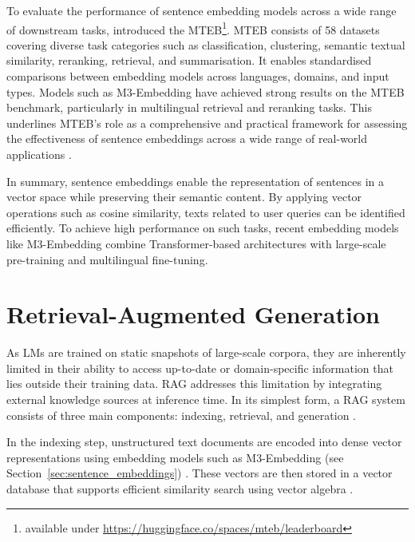 \documentclass[a4paper,oneside,bibliography=totoc]{scrbook}
\begin{document}
To evaluate the performance of sentence embedding models across a wide range of downstream tasks, \citet{Muennighoff2023} introduced the \ac{MTEB}\footnote{available under \url{https://huggingface.co/spaces/mteb/leaderboard}}. \ac{MTEB} consists of 58 datasets covering diverse task categories such as classification, clustering, semantic textual similarity, reranking, retrieval, and summarisation. It enables standardised comparisons between embedding models across languages, domains, and input types. Models such as M3-Embedding have achieved strong results on the \ac{MTEB} benchmark, particularly in multilingual retrieval and reranking tasks. This underlines \ac{MTEB}'s role as a comprehensive and practical framework for assessing the effectiveness of sentence embeddings across a wide range of real-world applications \cite{Muennighoff2023}.

In summary, sentence embeddings enable the representation of sentences in a vector space while preserving their semantic content. By applying vector operations such as cosine similarity, texts related to user queries can be identified efficiently. To achieve high performance on such tasks, recent embedding models like M3-Embedding combine Transformer-based architectures with large-scale pre-training and multilingual fine-tuning.


\section{Retrieval-Augmented Generation}
\label{sec:retrieval_augmented_generation}

As \acp{LM} are trained on static snapshots of large-scale corpora, they are inherently limited in their ability to access up-to-date or domain-specific information that lies outside their training data. \Ac{RAG} addresses this limitation by integrating external knowledge sources at inference time. In its simplest form, a \ac{RAG} system consists of three main components: indexing, retrieval, and generation \cite{Gao2024}.

In the indexing step, unstructured text documents are encoded into dense vector representations using embedding models such as M3-Embedding (see Section~\ref{sec:sentence_embeddings}) \cite{Gao2024}. These vectors are then stored in a vector database that supports efficient similarity search using vector algebra \cite{Gao2024,Pan2024}.
\end{document}
